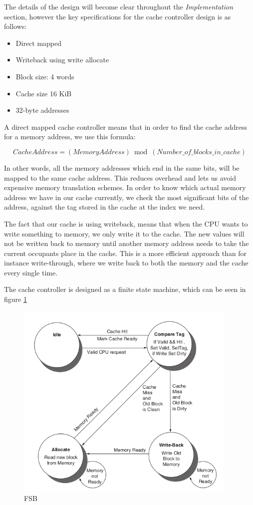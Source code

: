 \documentclass{article}
\begin{document}
The details of the design will become clear throughout the \textit{Implementation} section, however the key specifications for the cache controller design is as follows:
\begin{itemize}
  \item{Direct mapped}
  \item{Writeback using write allocate}
  \item{Block size: 4 words}
  \item{Cache size 16 KiB}
  \item{32-byte addresses}
\end{itemize}

A direct mapped cache controller means that in order to find the cache address for a memory address, we use this formula:

\begin{equation*}
  CacheAddress = (MemoryAddress) \bmod (Number\_of\_blocks\_in\_cache)
\end{equation*}

In other words, all the memory addresses which end in the same bits, will be mapped to the same cache address. This reduces overhead and lets us avoid expensive memory translation schemes. In order to know which actual memory address we have in our cache currently, we check the most significant bits of the address, against the tag stored in the cache at the index we need.

The fact that our cache is using writeback, means that when the CPU wants to write something to memory, we only write it to the cache. The new values will not be written back to memory until another memory address needs to take the current occupants place in the cache. This is a more efficient approach than for instance write-through, where we write back to both the memory and the cache every single time.

The cache controller is designed as a finite state machine, which can be seen in figure \ref{FSB}


\begin{figure}[H]
 \centering
  \includegraphics[width=300pt]{img/FSB.png}
  \caption{FSB\cite{BOOK}}
  \label{FSB}
 \end{figure}
\end{document}
